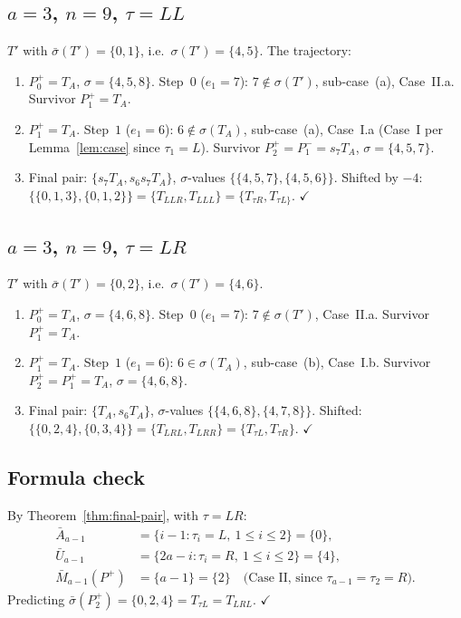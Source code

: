 \documentclass[11pt]{article}
\theoremstyle{definition}
\begin{document}
\subsection{$a=3$, $n=9$, $\tau=LL$}

$T'$ with $\bar\sigma(T')=\{0,1\}$, i.e.\ $\sigma(T')=\{4,5\}$.  The
trajectory:
\begin{enumerate}[leftmargin=2em,topsep=0.3em,itemsep=0.2em]
\item $P_0^+=T_A$, $\sigma=\{4,5,8\}$.  Step~$0$ ($e_1=7$): $7\notin
\sigma(T')$, sub-case~(a), Case~II.a.  Survivor $P_1^+=T_A$.
\item $P_1^+=T_A$.  Step~$1$ ($e_1=6$): $6\notin\sigma(T_A)$,
sub-case~(a), Case~I.a (Case~I per Lemma~\ref{lem:case} since
$\tau_1=L$).  Survivor $P_2^+=P_1^-=s_7T_A$, $\sigma=\{4,5,7\}$.
\item Final pair: $\{s_7T_A,s_6s_7T_A\}$, $\sigma$-values
$\{\{4,5,7\},\{4,5,6\}\}$.  Shifted by $-4$:
$\{\{0,1,3\},\{0,1,2\}\}=\{T_{LLR},T_{LLL}\}=\{T_{\tau R},T_{\tau L\}}$.
$\checkmark$
\end{enumerate}

\subsection{$a=3$, $n=9$, $\tau=LR$}

$T'$ with $\bar\sigma(T')=\{0,2\}$, i.e.\ $\sigma(T')=\{4,6\}$.
\begin{enumerate}[leftmargin=2em,topsep=0.3em,itemsep=0.2em]
\item $P_0^+=T_A$, $\sigma=\{4,6,8\}$.  Step~$0$ ($e_1=7$): $7\notin
\sigma(T')$, Case~II.a.  Survivor $P_1^+=T_A$.
\item $P_1^+=T_A$.  Step~$1$ ($e_1=6$): $6\in\sigma(T_A)$, sub-case~(b),
Case~I.b.  Survivor $P_2^+=P_1^+=T_A$, $\sigma=\{4,6,8\}$.
\item Final pair: $\{T_A,s_6T_A\}$, $\sigma$-values
$\{\{4,6,8\},\{4,7,8\}\}$.  Shifted:
$\{\{0,2,4\},\{0,3,4\}\}=\{T_{LRL},T_{LRR}\}=\{T_{\tau L},T_{\tau R}\}$.
$\checkmark$
\end{enumerate}

\subsection{Formula check}

By Theorem~\ref{thm:final-pair}, with $\tau=LR$:
\begin{align*}
   \bar A_{a-1} & = \{i-1 : \tau_i=L,\ 1\le i\le 2\} = \{0\}, \\
   \bar U_{a-1} & = \{2a-i : \tau_i=R,\ 1\le i\le 2\} = \{4\}, \\
   \bar M_{a-1}(P^+) & = \{a-1\}=\{2\}\quad\text{(Case II, since }\tau_{a-1}=\tau_2=R\text{).}
\end{align*}
Predicting $\bar\sigma(P_2^+)=\{0,2,4\}=T_{\tau L}=T_{LRL}$. $\checkmark$
\end{document}
